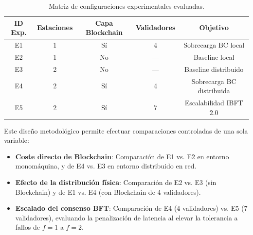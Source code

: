 \begin{table}[htbp]
\caption{Matriz de configuraciones experimentales evaluadas.}\label{tab:configuraciones}
\begin{tabular*}{\textwidth}{@{\extracolsep\fill}ccccc}
\toprule
\textbf{ID Exp.} & \textbf{Estaciones} & \textbf{Capa Blockchain} & \textbf{Validadores} & \textbf{Objetivo} \\
\midrule
E1 & 1 & Sí & 4 & Sobrecarga BC local \\
E2 & 1 & No & --- & Baseline local \\
E3 & 2 & No & --- & Baseline distribuido \\
E4 & 2 & Sí & 4 & Sobrecarga BC distribuida \\
E5 & 2 & Sí & 7 & Escalabilidad IBFT 2.0 \\
\bottomrule
\end{tabular*}
\end{table}

Este diseño metodológico permite efectuar comparaciones controladas de una sola variable:
\begin{itemize}
    \item \textbf{Coste directo de Blockchain}: Comparación de E1 vs. E2 en entorno monomáquina, y de E4 vs. E3 en entorno distribuido en red.
    \item \textbf{Efecto de la distribución física}: Comparación de E2 vs. E3 (sin Blockchain) y de E1 vs. E4 (con Blockchain de 4 validadores).
    \item \textbf{Escalado del consenso BFT}: Comparación de E4 (4 validadores) vs. E5 (7 validadores), evaluando la penalización de latencia al elevar la tolerancia a fallos de $f=1$ a $f=2$.
\end{itemize}


